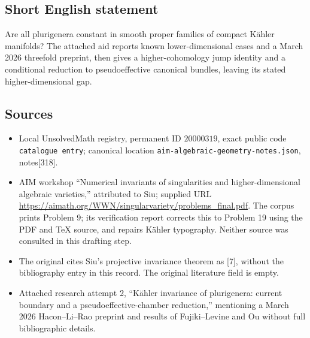 \documentclass[11pt]{article}
\begin{document}
\subsection{Short English statement}
Are all plurigenera constant in smooth proper families of compact K\"ahler manifolds? The attached aid reports known lower-dimensional cases and a March 2026 threefold preprint, then gives a higher-cohomology jump identity and a conditional reduction to pseudoeffective canonical bundles, leaving its stated higher-dimensional gap.
\subsection{Sources}
\begin{itemize}
\item Local UnsolvedMath registry, permanent ID \(20000319\), exact public code \texttt{catalogue entry}; canonical location \texttt{aim-algebraic-geometry-notes.json}, notes[318].
\item AIM workshop ``Numerical invariants of singularities and higher-dimensional algebraic varieties,'' attributed to Siu; supplied URL \url{https://aimath.org/WWN/singularvariety/problems_final.pdf}. The corpus prints Problem 9; its verification report corrects this to Problem 19 using the PDF and TeX source, and repairs K\"ahler typography. Neither source was consulted in this drafting step.
\item The original cites Siu's projective invariance theorem as [7], without the bibliography entry in this record. The original literature field is empty.
\item Attached research attempt 2, ``K\"ahler invariance of plurigenera: current boundary and a pseudoeffective-chamber reduction,'' mentioning a March 2026 Hacon--Li--Rao preprint and results of Fujiki--Levine and Ou without full bibliographic details.
\end{itemize}
\end{document}
